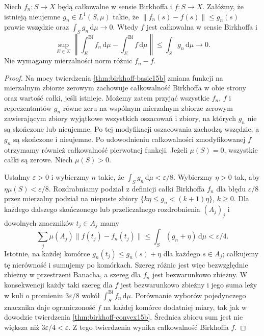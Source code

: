 \begin{twierdzenie}
\label{thm:birkhoff-limit15b}
Niech $f_n:S\to X$ będą całkowalne w sensie Birkhoffa
i $f:S\to X$. Załóżmy, że istnieją nieujemne
$g_n\in L^1(S,\mu)$ takie, że
$\|f_n(s)-f(s)\|\le g_n(s)$ prawie wszędzie oraz
$\int_S g_n\,\mathrm d\mu\to0$.
Wtedy $f$ jest całkowalna w sensie Birkhoffa i
\[
 \sup_{E\in\Sigma}\left\|
 \int_E^{\mathrm{Bi}}f_n\,\mathrm d\mu-
 \int_E^{\mathrm{Bi}}f\,\mathrm d\mu\right\|
 \le\int_S g_n\,\mathrm d\mu\longrightarrow0.
\]
Nie wymagamy mierzalności norm różnic $f_n-f$.
\end{twierdzenie}
\begin{proof}
Na mocy twierdzenia \ref{thm:birkhoff-basic15b}
zmiana funkcji na mierzalnym zbiorze zerowym
zachowuje całkowalność Birkhoffa w obie strony
oraz wartość całki, jeśli istnieje. Możemy zatem
przyjąć wszystkie $f_n$, $f$ i reprezentantów $g_n$
równe zeru na wspólnym mierzalnym zbiorze zerowym
zawierającym zbiory wyjątkowe wszystkich oszacowań
i zbiory, na których $g_n$ nie są skończone lub
nieujemne. Po tej modyfikacji oszacowania zachodzą
wszędzie, a $g_n$ są skończone i nieujemne.
Po udowodnieniu całkowalności zmodyfikowanej $f$
otrzymamy również całkowalność pierwotnej funkcji. Jeżeli $\mu(S)=0$,
wszystkie całki są zerowe. Niech $\mu(S)>0$.

Ustalmy $\varepsilon>0$ i wybierzmy $n$ takie, że
$\int_S g_n\,\mathrm d\mu<\varepsilon/8$.
Wybierzmy $\eta>0$ tak, aby $\eta\mu(S)<\varepsilon/8$.
Rozdrabniamy podział z definicji całki Birkhoffa
$f_n$ dla błędu $\varepsilon/8$ przez mierzalny
podział na niepuste zbiory
$\{k\eta\le g_n<(k+1)\eta\}$, $k\ge0$.
Dla każdego dalszego skończonego lub przeliczalnego
rozdrobnienia $(A_j)_j$ i dowolnych znaczników $t_j\in A_j$
mamy
\[
 \sum_j\mu(A_j)\|f(t_j)-f_n(t_j)\|
 \le\int_S(g_n+\eta)\,\mathrm d\mu
 <\varepsilon/4.
\]
Istotnie, na każdej komórce $g_n(t_j)\le g_n(s)+\eta$
dla każdego $s\in A_j$; całkujemy tę nierówność
i sumujemy po komórkach. Szereg różnic jest więc
bezwzględnie zbieżny w przestrzeni Banacha,
a szereg dla $f_n$ jest bezwarunkowo zbieżny.
W konsekwencji każdy taki szereg dla $f$
jest bezwarunkowo zbieżny i jego suma leży
w kuli o promieniu $3\varepsilon/8$ wokół
$\int_S^{\mathrm{Bi}}f_n\,\mathrm d\mu$.
Porównanie wyborów pojedynczego znacznika daje
ograniczoność $f$ na każdej komórce dodatniej miary,
tak jak w dowodzie twierdzenia
\ref{thm:birkhoff-convex15b}.
Średnica zbioru sum jest nie większa niż
$3\varepsilon/4<\varepsilon$.
Z tego twierdzenia wynika całkowalność Birkhoffa $f$.


\end{proof}
